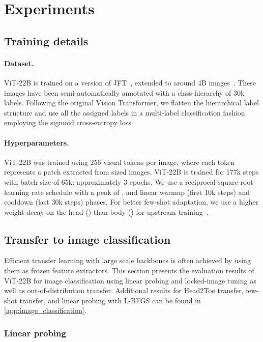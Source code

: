 \documentclass{article}
\newcommand{\chonk}{\mbox{ViT-22B}\xspace}
\begin{document}
 \section{Experiments}
\label{sec:evaluation}


\subsection{Training details}
\label{sec:training}
\paragraph{Dataset.}
\chonk is trained on a version of JFT~\citep{sun2017revisiting}, extended to around 4B images~\citep{zhai2022scaling}.
These images have been semi-automatically annotated with a class-hierarchy of 30k labels.
Following the original Vision Transformer, we flatten the hierarchical label structure and use all the assigned labels in a multi-label classification fashion employing the sigmoid cross-entropy loss.

\paragraph{Hyperparameters.}
\chonk was trained using 256 visual tokens per image, where each token represents a  patch extracted from  sized images. 
\chonk is trained for 177k steps with batch size of 65k: approximately 3 epochs.
We use a reciprocal square-root learning rate schedule with a peak of , and linear warmup (first 10k steps) and cooldown (last 30k steps) phases. For better few-shot adaptation, we use a higher weight decay on the head () than body () for upstream training~\citep{zhai2022scaling, abnar2021exploring}. 


\subsection{Transfer to image classification}
Efficient transfer learning with large scale backbones is often achieved by using them as frozen feature extractors. This section presents the evaluation results of \chonk for image classification using linear probing and locked-image tuning as well as out-of-distribution transfer. Additional results for  Head2Toe transfer, few-shot transfer, and linear probing with L-BFGS can be found in \cref{app:image_classification}.

\subsubsection{Linear probing}
\end{document}
